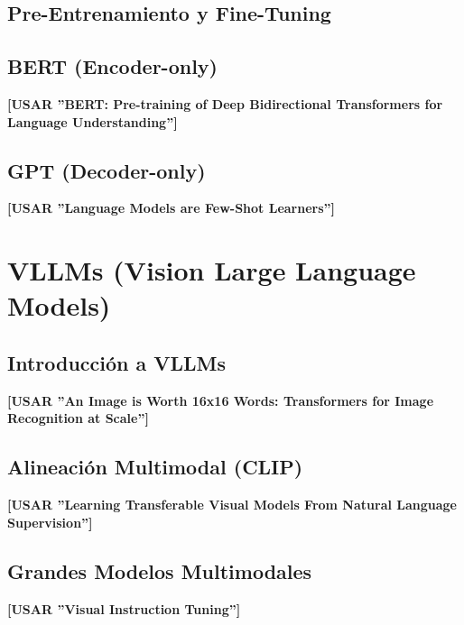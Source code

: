 \documentclass[11pt, a4paper]{article}
\begin{document}
\subsection{Pre-Entrenamiento y Fine-Tuning}

\subsection{BERT (Encoder-only)}
\textbf{[USAR ''BERT: Pre-training of Deep Bidirectional Transformers for Language Understanding'']}

\subsection{GPT (Decoder-only)}
\textbf{[USAR ''Language Models are Few-Shot Learners'']}


\section{VLLMs (Vision Large Language Models)}
\subsection{Introducción a VLLMs}
\textbf{[USAR ''An Image is Worth 16x16 Words: Transformers for Image Recognition at Scale'']}

\subsection{Alineación Multimodal (CLIP)}
\textbf{[USAR ''Learning Transferable Visual Models From Natural Language Supervision'']}

\subsection{Grandes Modelos Multimodales}
\textbf{[USAR ''Visual Instruction Tuning'']}

\printbibliography
\end{document}
